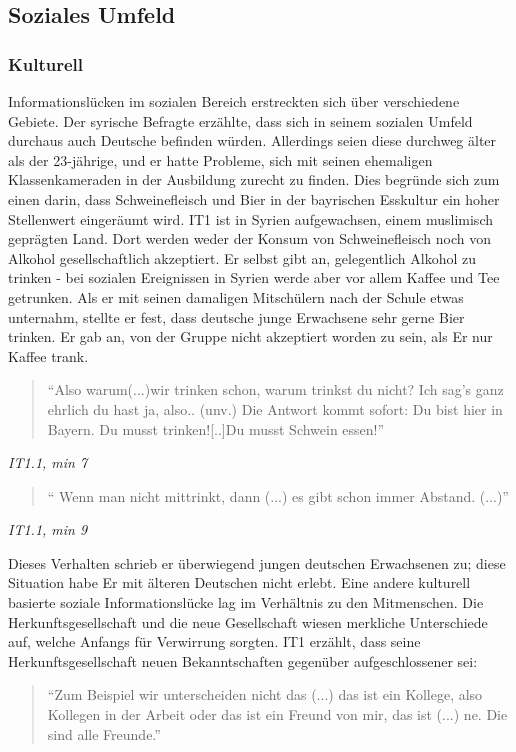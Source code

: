 \subsection{Soziales Umfeld}

\subsubsection{Kulturell}
Informationslücken im sozialen Bereich erstreckten sich über verschiedene Gebiete. Der syrische Befragte erzählte, dass sich in seinem sozialen Umfeld durchaus auch Deutsche befinden würden. Allerdings seien diese durchweg älter als der 23-jährige, und er hatte Probleme, sich mit seinen ehemaligen Klassenkameraden in der Ausbildung zurecht zu finden. Dies begründe sich zum einen darin, dass Schweinefleisch und Bier in der bayrischen Esskultur ein hoher Stellenwert eingeräumt wird. IT1 ist in Syrien aufgewachsen, einem muslimisch geprägten Land. Dort werden weder der Konsum von Schweinefleisch noch von Alkohol gesellschaftlich akzeptiert.\newline
Er selbst gibt an, gelegentlich Alkohol zu trinken - bei sozialen Ereignissen in Syrien werde aber vor allem Kaffee und Tee getrunken. Als er mit seinen damaligen Mitschülern nach der Schule etwas unternahm, stellte er fest, dass deutsche junge Erwachsene sehr gerne Bier trinken. Er gab an, von der Gruppe nicht akzeptiert worden zu sein, als Er nur Kaffee trank.
\begin{quote}
    ``Also warum(...)wir trinken schon, warum trinkst du nicht? Ich sag's ganz ehrlich du hast ja, also.. (unv.) Die Antwort kommt sofort: Du bist hier in Bayern. Du musst trinken![..]Du musst Schwein essen!''
\end{quote}
\centerline{\textit{IT1.1, min 7}}
\begin{quote}
    `` Wenn man nicht mittrinkt, dann (...) es gibt schon immer Abstand. (...)''
\end{quote}
\centerline{\textit{IT1.1, min 9}}
Dieses Verhalten schrieb er überwiegend jungen deutschen Erwachsenen zu; diese Situation habe Er mit älteren Deutschen nicht erlebt.\newline
Eine andere kulturell basierte soziale Informationslücke lag im Verhältnis zu den Mitmenschen. Die Herkunftsgesellschaft und die neue Gesellschaft wiesen merkliche Unterschiede auf, welche Anfangs für Verwirrung sorgten.\newline
IT1 erzählt, dass seine Herkunftsgesellschaft neuen Bekanntschaften gegenüber aufgeschlossener sei:
\begin{quote}
    ``Zum Beispiel wir unterscheiden nicht das (...) das ist ein Kollege, also Kollegen in der Arbeit oder das ist ein Freund von mir, das ist (...) ne. Die sind alle Freunde.''
\end{quote}
